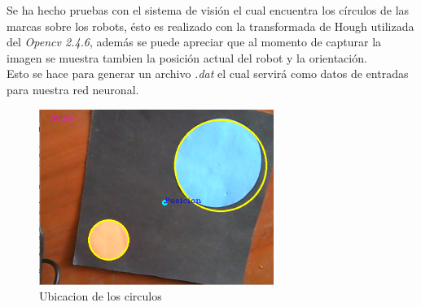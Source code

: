 Se ha hecho pruebas con el sistema de visi\'on el cual encuentra los c\'irculos de las marcas sobre los robots, \'esto es realizado con la transformada de Hough utilizada del \textit{Opencv 2.4.6}, adem\'as se puede apreciar que al momento de capturar la imagen se muestra tambien la posici\'on actual del robot y la orientaci\'on.\\
 Esto se hace para generar un archivo \textit{.dat} el cual servir\'a como datos de entradas para nuestra red neuronal.\\
\begin{figure}
	\centering
	\includegraphics[width=3.0in]{visi.pdf}
	
	\caption{Ubicacion de los circulos}
	\label{fig_mar}
\end{figure}


